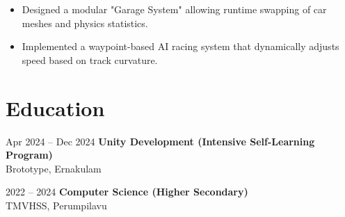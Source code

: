 \documentclass[10pt, letterpaper]{article}
\newenvironment{highlights}{
    \begin{itemize}[topsep=0.05cm, parsep=0.05cm, itemsep=0pt, leftmargin=10pt]
}{
    \end{itemize}
}
\begin{document}
\vspace{0.1 cm}

\begin{onecolentry}
    \begin{highlights}
        \item Designed a modular "Garage System" allowing runtime swapping of car meshes and physics statistics.
        \item Implemented a waypoint-based AI racing system that dynamically adjusts speed based on track curvature.
    \end{highlights}
\end{onecolentry}

\vspace{0.5 cm}

\section{Education}

\begin{twocolentry}{
    Apr 2024 – Dec 2024
}
    \textbf{Unity Development (Intensive Self-Learning Program)} \\
    Brototype, Ernakulam
\end{twocolentry}

\vspace{0.5 cm}
\begin{twocolentry}{
    2022 – 2024
}
    \textbf{Computer Science (Higher Secondary)} \\
    TMVHSS, Perumpilavu
\end{twocolentry}
\end{document}
